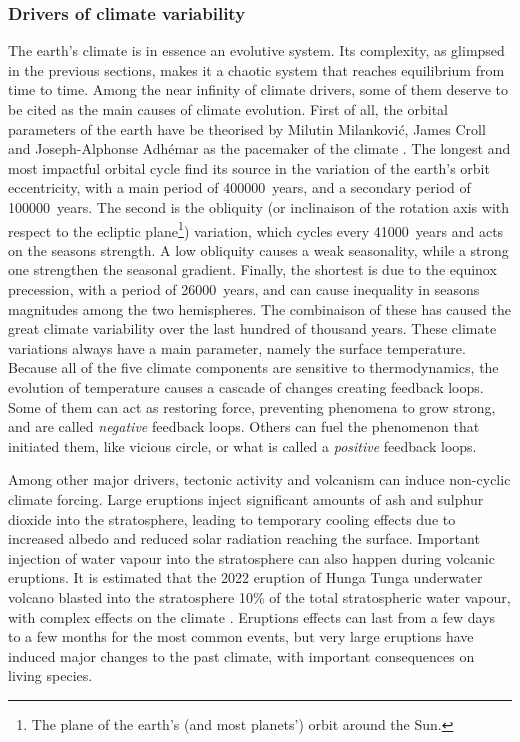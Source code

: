     \subsubsection{Drivers of climate variability}
    The earth's climate is in essence an evolutive system. Its complexity, as glimpsed in the previous sections, makes it a chaotic system that reaches equilibrium from time to time.
    Among the near infinity of climate drivers, some of them deserve to be cited as the main causes of climate evolution. 
    First of all, the orbital parameters of the earth have be theorised by Milutin Milanković, James Croll and Joseph-Alphonse Adhémar as the pacemaker of the climate \citep{hays_variations_1976}.
    The longest and most impactful orbital cycle find its source in the variation of the earth's orbit eccentricity, with a main period of \SI{400000}{years}, and a secondary period of \SI{100000}{years}.
    The second is the obliquity (or inclinaison of the rotation axis with respect to the ecliptic plane\footnote{The plane of the earth's (and most planets') orbit around the Sun.}) variation, which cycles every \SI{41000}{years} and acts on the seasons strength. A low obliquity causes a weak seasonality, while a strong one strengthen the seasonal gradient.
    Finally, the shortest is due to the equinox precession, with a period of \SI{26000}{years}, and can cause inequality in seasons magnitudes among the two hemispheres.
    The combinaison of these has caused the great climate variability over the last hundred of thousand years.
    These climate variations always have a main parameter, namely the surface temperature. Because all of the five climate components are sensitive to thermodynamics, the evolution of temperature causes a cascade of changes creating feedback loops. 
    Some of them can act as restoring force, preventing phenomena to grow strong, and are called \textit{negative} feedback loops.
    Others can fuel the phenomenon that initiated them, like vicious circle, or what is called a \textit{positive} feedback loops.
    
    Among other major drivers, tectonic activity and volcanism can induce non-cyclic climate forcing. Large eruptions inject significant amounts of ash and sulphur dioxide into the stratosphere, leading to temporary cooling effects due to increased albedo and reduced solar radiation reaching the surface. Important injection of water vapour into the stratosphere can also happen during volcanic eruptions. It is estimated that the 2022 eruption of Hunga Tunga underwater volcano blasted into the stratosphere 10\% of the total stratospheric water vapour, with complex effects on the climate \citep{chen_impact_2025}.
    Eruptions effects can last from a few days to a few months for the most common events, but very large eruptions have induced major changes to the past climate, with important consequences on living species. 
    
